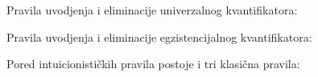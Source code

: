 \documentclass[a4paper,10pt]{article}
\theoremstyle{definition}
\begin{document}
Pravila uvodjenja i eliminacije univerzalnog kvantifikatora:

\begin{center}
    \begin{minipage}{0.4\textwidth}
        \begin{prooftree}[$\forall_{I}$]
        \end{prooftree}
    \end{minipage}
    \begin{minipage}{0.5\textwidth}
        \begin{prooftree}[$\forall_{E}$]
        \end{prooftree}
    \end{minipage}
\end{center}

Pravila uvodjenja i eliminacije egzistencijalnog kvantifikatora:

\begin{center}
    \begin{minipage}{0.4\textwidth}
        \begin{prooftree}[$\exists_{I}$]
        \end{prooftree}
    \end{minipage}
    \begin{minipage}{0.5\textwidth}
        \begin{prooftree}[$\exists_{E}$]
        \end{prooftree}
    \end{minipage}
\end{center}

Pored intuicionističkih pravila postoje i tri klasična pravila:
\end{document}
